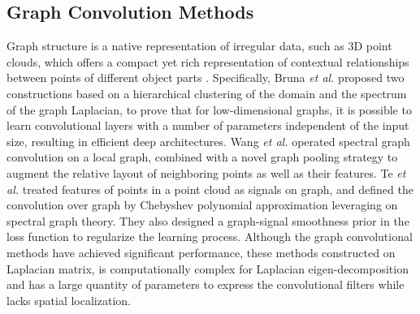 \documentclass{cta-author}
\begin{document}
\subsection{Graph Convolution Methods}
Graph structure is a native representation of irregular data, such as 3D point clouds, which offers a compact yet rich representation of contextual relationships between points of different object parts \cite{bruna2013spectral,wang2018local,te2018rgcnn,simonovsky2017dynamic,wang2019graph,Landrieu2018Large}. Specifically, Bruna \emph{et al.} \cite{bruna2013spectral} proposed two constructions based on a hierarchical clustering of the domain and the spectrum of the graph Laplacian, to prove that for low-dimensional graphs, it is possible to learn convolutional layers with a number of parameters independent of the input size, resulting in efficient deep architectures. Wang \emph{et al.} \cite{wang2018local} operated spectral graph convolution on a local graph, combined with a novel graph pooling strategy to augment the relative layout of neighboring points as well as their features. Te \emph{et al.} \cite{te2018rgcnn} treated features of points in a point cloud as signals on graph, and defined the convolution over graph by Chebyshev polynomial approximation leveraging on spectral graph theory. They also designed a graph-signal smoothness prior in the loss function to regularize the learning process. Although the graph convolutional methods have achieved significant performance, these methods constructed on Laplacian matrix, is computationally complex for Laplacian eigen-decomposition and has a large quantity of parameters to express the convolutional filters while lacks spatial localization.
\end{document}
